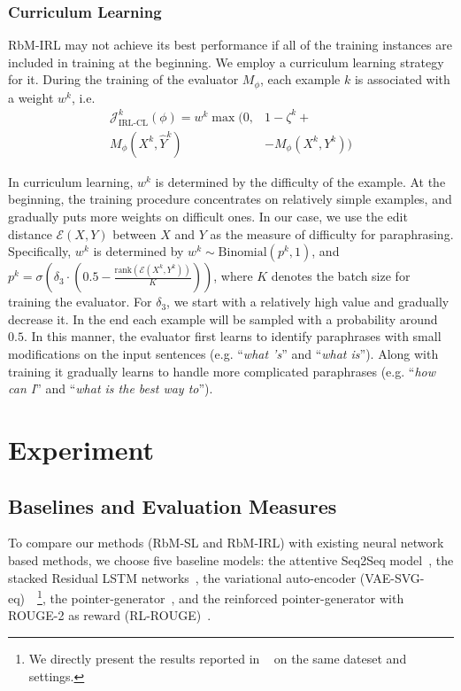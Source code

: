 \documentclass[11pt,a4paper]{article}
\newcommand{\MP}{M_{\phi}}
\begin{document}
    \subsubsection*{Curriculum Learning}
    RbM-IRL may not achieve its best performance if all of the training instances are included in training at the beginning. We employ a curriculum learning strategy~\citep{bengio2009curriculum} for it. During the training of the evaluator $\MP$, each example $k$ is associated with a weight $w^k$, i.e.
    \vspace{-5pt}
        \begin{align}
            \mathcal{J}^k_{\text{IRL-CL}}(\phi) =  w^k \max (0, & 1 - \zeta^k + \nonumber\\
             M_{\phi}(X^k, \hat{Y}^k) & - M_{\phi}(X^k, Y^k) ) \label{eqn:cl-1}
        \end{align}

    In curriculum learning, $w^k$ is determined by the difficulty of the example. At the beginning, the training procedure concentrates on relatively simple examples, and gradually puts more weights on difficult ones. In our case, we use the edit distance $\mathcal{E}(\mathord{X}, \mathord{Y})$ between $X$ and $Y$ as the measure of difficulty for paraphrasing. Specifically, $w^k$ is determined by $w^k \sim \text{Binomial}(p^k, 1)$, and $p^k = \sigma(\delta_3 \cdot (0.5-\frac{\text{rank}(\mathcal{E}(X^k, Y^k))}{K}))$, where $K$ denotes the batch size for training the evaluator. For $\delta_3$, we start with a relatively high value and gradually decrease it. In the end each example will be sampled with a probability around $0.5$. In this manner, the evaluator first learns to identify paraphrases with small modifications on the input sentences (e.g. ``\textit{what 's}'' and ``\textit{what is}''). Along with training it gradually learns to handle more complicated paraphrases (e.g. ``\textit{how can I}'' and ``\textit{what is the best way to}'').

\section{Experiment}\label{sec:exp}

    \subsection{Baselines and Evaluation Measures}
    To compare our methods (RbM-SL and RbM-IRL) with existing neural network based methods, we choose five baseline models: the attentive Seq2Seq model~\citep{bahdanau2014neural}, the stacked Residual LSTM networks~\citep{prakash2016neural}, the variational auto-encoder (VAE-SVG-eq)~\citep{gupta2017deep}~\footnote{We directly present the results reported in ~\citet{gupta2017deep} on the same dateset and settings.}, the pointer-generator~\citep{see2017get}, and the reinforced pointer-generator with ROUGE-2 as reward (RL-ROUGE)~\citep{ranzato2015sequence}.
\end{document}
